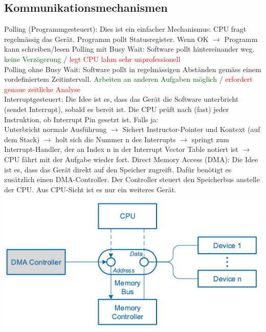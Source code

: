 \documentclass[8pt,landscape,a4paper]{scrartcl}
\begin{document}
\begin{multicols*}{5}
\subsection{Kommunikationsmechanismen}
\textcolor{b}{Polling (Programmgesteuert)}: Dies ist ein einfacher Mechanismus: CPU fragt regelmässig das Gerät. Programm pollt Statusregister. Wenn OK $\rightarrow$ Programm kann schreiben/lesen
\textcolor{b}{Polling mit Busy Wait}: Software pollt hintereinander weg. \textcolor{darkgreen}{keine Verzögerung} / \textcolor{red}{legt CPU lahm sehr unprofessionell}\\
\textcolor{b}{Polling ohne Busy Wait}: Software pollt in regelmässigen Abständen gemäss einem vordefiniertem Zeitintervall. \textcolor{darkgreen}{Arbeiten an anderen Aufgaben möglich} / \textcolor{red}{erfordert genaue zeitliche Analyse}\\ 
\textcolor{b}{Interruptgesteuert}: Die Idee ist es, dass das Gerät die Software unterbricht (sendet Interrupt), sobald es bereit ist. Die CPU prüft nach (fast) jeder Instruktion, ob Interrupt Pin gesetzt ist. Falls ja:\\
Unterbricht normale Ausführung $\rightarrow$ Sichert Instructor-Pointer und Kontext (auf dem Stack) $\rightarrow$ holt sich die Nummer n des Interrupts $\rightarrow$ springt zum Interrupt-Handler, der an Index n in der Interrupt Vector Table notiert ist $\rightarrow$ CPU fährt mit der Aufgabe wieder fort.
\textcolor{b}{Direct Memory Access (DMA)}: Die Idee ist es, dass das Gerät direkt auf den Speicher zugreift. Dafür benötigt es zusätzlich einen DMA-Controller. Der Controller steuert den Speicherbus anstelle der CPU. Aus CPU-Sicht ist es nur ein weiteres Gerät.
\begin{center}
	\vspace{-5pt}
	\includegraphics[scale=.5]{Graphic/DMA}
	\vspace{-5pt}
\end{center}


\end{multicols*}
\end{document}
